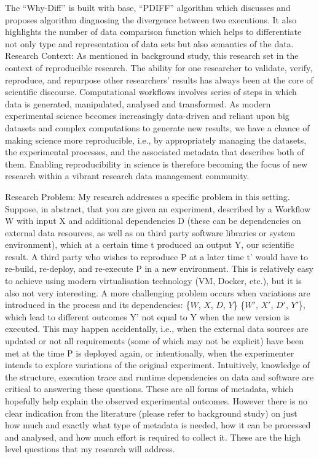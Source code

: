 \documentclass[10pt,conference,twocolumn]{IEEEtran}
\begin{document}
 The \enquote{Why-Diff} is built with base, \enquote{PDIFF} algorithm  which discusses and proposes algorithm diagnosing the divergence between two executions. It also highlights the number of data comparison function which helps to differentiate not only type and representation of data sets but also semantics of the data.
\vspace{-1mm}
Research Context:
As mentioned in background study, this research set in the context of reproducible research. The ability for one researcher to validate, verify, reproduce, and repurpose other researchers’ results has always been at the core of scientific discourse. Computational workﬂows involves series of steps in which data is generated, manipulated, analysed and transformed. As modern experimental science becomes increasingly data-driven and reliant upon big datasets and complex computations to generate new results, we have a chance of making science more reproducible, i.e., by appropriately managing the datasets, the experimental processes, and the associated metadata that describes both of them. Enabling reproducibility in science is therefore becoming the focus of new research within a vibrant research data management community.

Research Problem:
My research addresses a specific problem in this setting. Suppose, in abstract, that you are given an experiment, described by a Workflow W with input X and additional dependencies D (these can be dependencies on external data resources, as well as on third party software libraries or system environment), which at a certain time t produced an output Y, our scientific result. A third party who wishes to reproduce P at a later time t’ would have to re-build, re-deploy, and re-execute P in a new environment. This is relatively easy to achieve using modern virtualisation technology (VM, Docker, etc.), but it is also not very interesting.
A more challenging problem occurs when variations are introduced in the process and its dependencies:  \{$W$, $X$, $D$, $Y$\} \textemdash   \{$W'$, $X'$, $D'$, $Y'$\}, which lead to different outcomes 
Y' not equal to Y when the new version is executed. This may happen accidentally, i.e., when the external data sources are updated or not all requirements (some of which may not be explicit) have been met at the time P is deployed again, or intentionally, when the experimenter intends to explore variations of the original experiment.
Intuitively, knowledge of the structure, execution trace and runtime dependencies on data and software are critical to answering these questions. These are all forms of metadata, which hopefully help explain the observed experimental outcomes. However there is no clear indication from the literature (please refer to background study) on just how much and exactly what type of metadata is needed, how it can be processed and analysed, and how much effort is required to collect it. These are the high level questions that my research will address.
\end{document}
